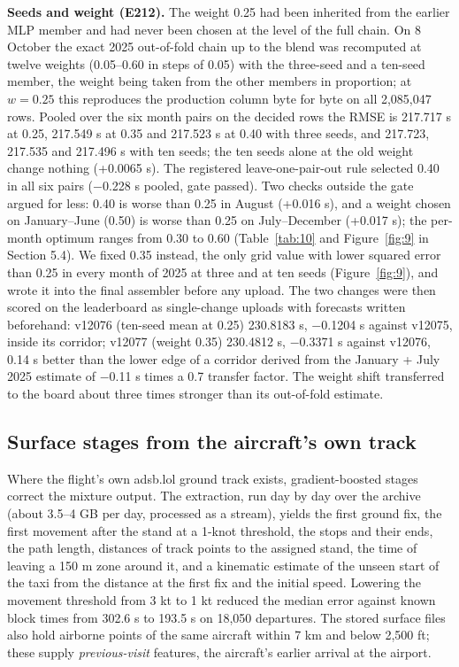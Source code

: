 \documentclass[11pt,a4paper]{article}
\begin{document}
\textbf{Seeds and weight (E212).} The weight 0.25 had been inherited from the earlier MLP member and had never been chosen at the level of the full chain. On 8 October the exact 2025 out-of-fold chain up to the blend was recomputed at twelve weights (0.05--0.60 in steps of 0.05) with the three-seed and a ten-seed member, the weight being taken from the other members in proportion; at \(w = 0.25\) this reproduces the production column byte for byte on all 2,085,047 rows. Pooled over the six month pairs on the decided rows the RMSE is 217.717 s at 0.25, 217.549 s at 0.35 and 217.523 s at 0.40 with three seeds, and 217.723, 217.535 and 217.496 s with ten seeds; the ten seeds alone at the old weight change nothing (+0.0065 s). The registered leave-one-pair-out rule selected 0.40 in all six pairs ($-$0.228 s pooled, gate passed). Two checks outside the gate argued for less: 0.40 is worse than 0.25 in August (+0.016 s), and a weight chosen on January--June (0.50) is worse than 0.25 on July--December (+0.017 s); the per-month optimum ranges from 0.30 to 0.60 (Table~\ref{tab:10} and Figure~\ref{fig:9} in Section 5.4). We fixed 0.35 instead, the only grid value with lower squared error than 0.25 in every month of 2025 at three and at ten seeds (Figure~\ref{fig:9}), and wrote it into the final assembler before any upload. The two changes were then scored on the leaderboard as single-change uploads with forecasts written beforehand: v12076 (ten-seed mean at 0.25) 230.8183 s, $-$0.1204 s against v12075, inside its corridor; v12077 (weight 0.35) 230.4812 s, $-$0.3371 s against v12076, 0.14 s better than the lower edge of a corridor derived from the January + July 2025 estimate of $-$0.11 s times a 0.7 transfer factor. The weight shift transferred to the board about three times stronger than its out-of-fold estimate.

\subsection{Surface stages from the aircraft's own track}\label{surface-stages-from-the-aircrafts-own-track}

Where the flight's own adsb.lol ground track exists, gradient-boosted stages correct the mixture output. The extraction, run day by day over the archive (about 3.5--4 GB per day, processed as a stream), yields the first ground fix, the first movement after the stand at a 1-knot threshold, the stops and their ends, the path length, distances of track points to the assigned stand, the time of leaving a 150 m zone around it, and a kinematic estimate of the unseen start of the taxi from the distance at the first fix and the initial speed. Lowering the movement threshold from 3 kt to 1 kt reduced the median error against known block times from 302.6 s to 193.5 s on 18,050 departures. The stored surface files also hold airborne points of the same aircraft within 7 km and below 2,500 ft; these supply \emph{previous-visit} features, the aircraft's earlier arrival at the airport.
\end{document}
